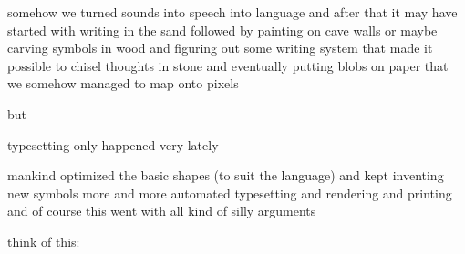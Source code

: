 

\definecolor[maincolor] [s=.6]
\definecolor[othercolor][s=.2]


\startdocument
  [title={How about those\\typographic virtues:\\do they still make sense?},
   subtitle={Hans Hagen\\EuroBacho\TeX\\May 2013}]

\StartSteps

\starttopic[title=Typesetting]

    \FlushStep

    \startitemize
        \startitem somehow we turned sounds into speech into language \FlushStep \stopitem
        \startitem and after that it may have started with writing in the sand \FlushStep \stopitem
        \startitem followed by painting on cave walls \FlushStep \stopitem
        \startitem or maybe carving symbols in wood \FlushStep \stopitem
        \startitem and figuring out some writing system \FlushStep \stopitem
        \startitem that made it possible to chisel thoughts in stone \FlushStep \stopitem
        \startitem and eventually putting blobs on paper \FlushStep \stopitem
        \startitem that we somehow managed to map onto pixels \FlushStep \stopitem
    \stopitemize

    but \FlushStep

    \startitemize
        \startitem typesetting only happened very lately \FlushStep \stopitem
    \stopitemize

\stoptopic

\StopSteps

\StartSteps

\starttopic[title=In the process]

    \FlushStep

    \startitemize
        \startitem mankind optimized the basic shapes (to suit the language) \FlushStep \stopitem
        \startitem and kept inventing new symbols \FlushStep \stopitem
        \startitem more and more automated typesetting and rendering and printing \FlushStep \stopitem
        \startitem and of course this went with all kind of silly arguments \FlushStep \stopitem
    \stopitemize

    think of this: \FlushStep

